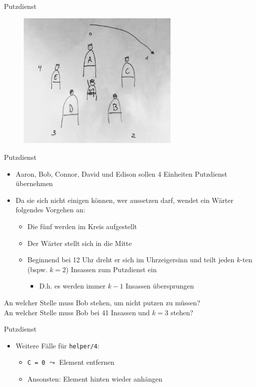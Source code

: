 \documentclass{beamer}
\newcommand{\code}[1]{
	\begin{mdframed}
		
	\end{mdframed}
}
\begin{document}
\begin{frame}{Putzdienst}
	\begin{figure}
		\includegraphics[width=0.7\textwidth]{images/putzdienst}
	\end{figure}
\end{frame}

\begin{frame}{Putzdienst}
	\begin{itemize}
		\item Aaron, Bob, Connor, David und Edison sollen 4 Einheiten Putzdienst übernehmen
		\item Da sie sich nicht einigen können, wer aussetzen darf, wendet ein Wärter folgendes Vorgehen an:
		\begin{itemize}
			\item Die fünf werden im Kreis aufgestellt
			\item Der Wärter stellt sich in die Mitte
			\item Beginnend bei 12 Uhr dreht er sich im Uhrzeigersinn und teilt jeden $k$-ten (bspw. $k = 2$) Insassen zum Putzdienst ein
			\begin{itemize}
				\item D.h. es werden immer $k - 1$ Insassen übersprungen
			\end{itemize}
		\end{itemize}
	\end{itemize}

	An welcher Stelle muss Bob stehen, um nicht putzen zu müssen?\\
	\pause
	An welcher Stelle muss Bob bei 41 Insassen und $k = 3$ stehen?
\end{frame}

\begin{frame}{Putzdienst}
	\code{demos/putzdienst.pl}

	\begin{itemize}
		\item Weitere Fälle für \texttt{helper/4}:
		\begin{itemize}
			\item \texttt{C = 0} $\leadsto$ Element entfernen
			\item Ansonsten: Element hinten wieder anhängen
		\end{itemize}
	\end{itemize}
\end{frame}
\end{document}
